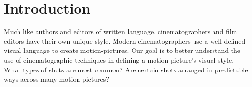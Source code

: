 \section*{Introduction}

Much like authors and editors of written language, cinematographers and film editors have their own unique style.
Modern cinematographers use a well-defined visual language to create motion-pictures. Our goal is to better understand the use of cinematographic techniques in defining a motion picture’s visual style. What types of shots are most common? Are certain shots arranged in predictable ways across many motion-pictures?

